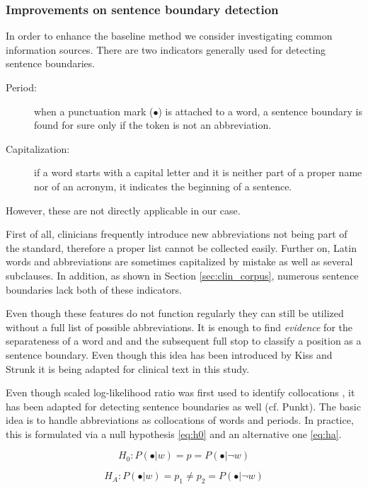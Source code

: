 \subsubsection{Improvements on sentence boundary detection}\label{sec:improvements}

In order to enhance the baseline method we consider investigating common information sources. 
There are two indicators generally used for detecting sentence boundaries.
\begin{description}
 \item[Period:] when a punctuation mark ($\bullet$) is attached to a word, a sentence boundary is found for sure only if the token is not an abbreviation.
 \item[Capitalization:] if a word starts with a capital letter and it is neither part of a proper name nor of an acronym, it indicates the beginning of a sentence.
\end{description}
However, these are not directly applicable in our case. 

First of all, clinicians frequently introduce new abbreviations not being part of the standard, therefore a proper list cannot be collected easily. 
Further on, Latin words and abbreviations are sometimes capitalized by mistake as well as several subclauses. 
In addition, as shown in Section \ref{sec:clin_corpus}, numerous sentence boundaries lack both of these indicators.

Even though these features do not function regularly they can still be utilized without a full list of possible abbreviations. 
It is enough to find \emph{evidence} for the separateness of a word and and the subsequent full stop to classify a position as a sentence boundary. 
Even though this idea has been introduced by Kiss and Strunk \cite{kiss2006unsupervised} it is being adapted for clinical text in this study.

Even though scaled log-likelihood ratio was first used to identify collocations \cite{dunning1993accurate}, it has been adapted for detecting sentence boundaries as well (cf. Punkt\cite{kiss2006unsupervised}). 
The basic idea is to handle abbreviations as collocations of words and periods. 
In practice, this is formulated via a null hypothesis \eqref{eq:h0} and an alternative one \eqref{eq:ha}. 

\begin{equation} \label{eq:h0}
H_0: P(\bullet|w) = p = P(\bullet|\neg w)
\end{equation}

\begin{equation} \label{eq:ha}
H_A: P(\bullet|w) = p_1 \neq p_2 = P(\bullet|\neg w) 
\end{equation}

